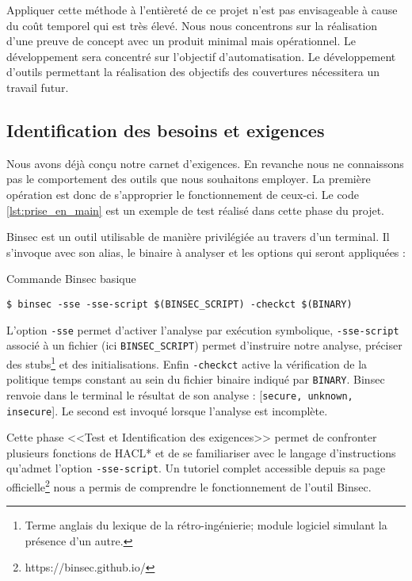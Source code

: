 Appliquer cette méthode à l'entièreté de ce projet n'est pas envisageable à cause du coût temporel qui est très élevé. Nous nous concentrons sur la réalisation d'une preuve de concept avec un produit minimal mais opérationnel. Le développement sera concentré sur l'objectif d'automatisation. Le développement d'outils permettant la réalisation des objectifs des couvertures nécessitera un travail futur.

\subsection*{Identification des besoins et exigences}

Nous avons déjà conçu notre carnet d'exigences. En revanche nous ne connaissons pas le comportement des outils que nous souhaitons employer. La première opération est donc de s'approprier le fonctionnement de ceux-ci. Le code \ref{lst:prise_en_main} est un exemple de test réalisé dans cette phase du projet.

Binsec est un outil utilisable de manière privilégiée au travers d'un terminal. Il s'invoque avec son alias, le binaire à analyser et les options qui seront appliquées :

\begin{listing}[!ht]
    \caption{Commande Binsec basique}
    \label{lst:commande_binsec}
    \begin{verbatim}
$ binsec -sse -sse-script $(BINSEC_SCRIPT) -checkct $(BINARY)
    \end{verbatim}
\end{listing}

L'option \texttt{-sse} permet d'activer l'analyse par exécution symbolique, \texttt{-sse-script} associé à un fichier (ici \texttt{BINSEC\_SCRIPT}) permet d'instruire notre analyse, préciser des stubs\footnote{Terme anglais du lexique de la rétro-ingénierie; module logiciel simulant la présence d'un autre.} et des initialisations. Enfin \texttt{-checkct} active la vérification de la politique temps constant au sein du fichier binaire indiqué par \texttt{BINARY}. Binsec renvoie dans le terminal le résultat de son analyse : [\texttt{secure, unknown, insecure}]. Le second est invoqué lorsque l'analyse est incomplète.\medbreak

Cette phase <<Test et Identification des exigences>> permet de confronter plusieurs fonctions de HACL* et de se familiariser avec le langage d'instructions qu'admet l'option \texttt{-sse-script}. Un tutoriel complet accessible depuis sa page officielle\footnote{https://binsec.github.io/} nous a permis de comprendre le fonctionnement de l'outil Binsec.

